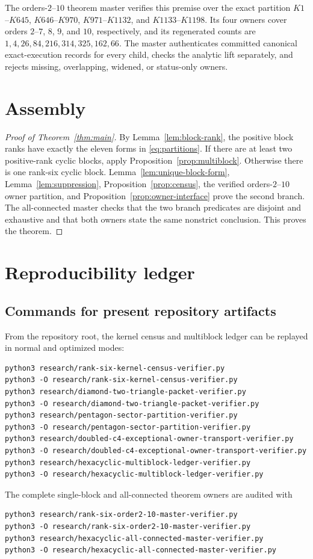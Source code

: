 \documentclass[11pt]{article}
\theoremstyle{definition}
\theoremstyle{remark}
\begin{document}
The orders-$2$--$10$ theorem master verifies this premise over the exact
partition $K1$--$K645$, $K646$--$K970$, $K971$--$K1132$, and
$K1133$--$K1198$.  Its four owners cover orders $2$--$7$, $8$, $9$, and $10$,
respectively, and its regenerated counts are
$1,4,26,84,216,314,325,162,66$.  The master authenticates committed canonical
exact-execution records for every child, checks the analytic lift separately,
and rejects missing, overlapping, widened, or status-only owners.

\section{Assembly}

\begin{proof}[Proof of Theorem~\ref{thm:main}]
By Lemma~\ref{lem:block-rank}, the positive block ranks have exactly the eleven
forms in \eqref{eq:partitions}.  If there are at least two positive-rank cyclic
blocks, apply Proposition~\ref{prop:multiblock}.  Otherwise there is one
rank-six cyclic block.  Lemma~\ref{lem:unique-block-form},
Lemma~\ref{lem:suppression},
Proposition~\ref{prop:census}, the verified orders-$2$--$10$ owner partition,
and Proposition~\ref{prop:owner-interface} prove the second branch.  The
all-connected master checks that the two branch predicates are disjoint and
exhaustive and that both owners state the same nonstrict conclusion.  This
proves the theorem.
\end{proof}

\appendix
\section{Reproducibility ledger}\label{app:repro}

\subsection{Commands for present repository artifacts}

From the repository root, the kernel census and multiblock ledger can be
replayed in normal and optimized modes:
\begin{verbatim}
python3 research/rank-six-kernel-census-verifier.py
python3 -O research/rank-six-kernel-census-verifier.py
python3 research/diamond-two-triangle-packet-verifier.py
python3 -O research/diamond-two-triangle-packet-verifier.py
python3 research/pentagon-sector-partition-verifier.py
python3 -O research/pentagon-sector-partition-verifier.py
python3 research/doubled-c4-exceptional-owner-transport-verifier.py
python3 -O research/doubled-c4-exceptional-owner-transport-verifier.py
python3 research/hexacyclic-multiblock-ledger-verifier.py
python3 -O research/hexacyclic-multiblock-ledger-verifier.py
\end{verbatim}
The complete single-block and all-connected theorem owners are audited with
\begin{verbatim}
python3 research/rank-six-order2-10-master-verifier.py
python3 -O research/rank-six-order2-10-master-verifier.py
python3 research/hexacyclic-all-connected-master-verifier.py
python3 -O research/hexacyclic-all-connected-master-verifier.py
\end{verbatim}
\end{document}
